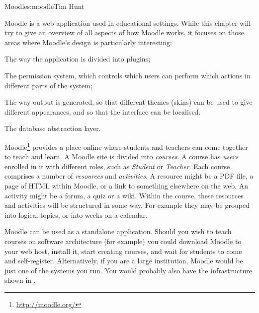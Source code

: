 \begin{aosachapter}{Moodle}{s:moodle}{Tim Hunt}

Moodle is a web application used in educational settings. While this chapter will
try to give an overview of all aspects of how Moodle works, it
focuses on those areas where Moodle's design is particularly
interesting:

\begin{aosaitemize}

\item The way the application is divided into plugins;

\item The permission system, which controls which users can perform
  which actions in different parts of the system;

\item The way output is generated, so that different themes (skins)
  can be used to give different appearances, and so that the interface
  can be localised.

\item The database abstraction layer.

\end{aosaitemize}

Moodle\footnote{\url{http://moodle.org/}} provides a place online
where students and teachers can come together to teach and learn. A
Moodle site is divided into \emph{courses}. A course has \emph{users}
enrolled in it with different roles, such as \emph{Student} or \emph{Teacher}. Each
course comprises a number of \emph{resources} and \emph{activities}. A resource
might be a PDF file, a page of HTML within Moodle, or a link to
something elsewhere on the web. An activity might be a forum, a quiz or a
wiki. Within the course, these resources and activities will be
structured in some way. For example they may be grouped into logical
topics, or into weeks on a calendar.


Moodle can be used as a standalone application. Should you wish to
teach courses on software architecture (for example) you could download Moodle to
your web host, install it, start creating courses, and wait for
students to come and self-register. Alternatively, if you are a large
institution, Moodle would be just one of the systems you run. You
would probably also have the infrastructure shown in
.



\end{aosachapter}
